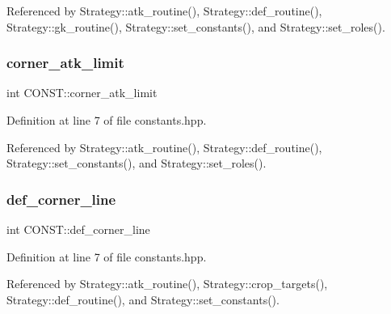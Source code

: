 Referenced by Strategy\+::atk\+\_\+routine(), Strategy\+::def\+\_\+routine(), Strategy\+::gk\+\_\+routine(), Strategy\+::set\+\_\+constants(), and Strategy\+::set\+\_\+roles().

\mbox{\label{namespace_c_o_n_s_t_a2dae2bbcbbd0735ad1544509929d1c8f}} 
\subsubsection{\texorpdfstring{corner\+\_\+atk\+\_\+limit}{corner\_atk\_limit}}
{\footnotesize\ttfamily int C\+O\+N\+S\+T\+::corner\+\_\+atk\+\_\+limit\hspace{0.3cm}{\ttfamily [static]}}



Definition at line 7 of file constants.\+hpp.



Referenced by Strategy\+::atk\+\_\+routine(), Strategy\+::def\+\_\+routine(), Strategy\+::set\+\_\+constants(), and Strategy\+::set\+\_\+roles().

\mbox{\label{namespace_c_o_n_s_t_a1ceb4c2871b41b2f17d5bff1e40e9dd0}} 
\subsubsection{\texorpdfstring{def\+\_\+corner\+\_\+line}{def\_corner\_line}}
{\footnotesize\ttfamily int C\+O\+N\+S\+T\+::def\+\_\+corner\+\_\+line\hspace{0.3cm}{\ttfamily [static]}}



Definition at line 7 of file constants.\+hpp.



Referenced by Strategy\+::atk\+\_\+routine(), Strategy\+::crop\+\_\+targets(), Strategy\+::def\+\_\+routine(), and Strategy\+::set\+\_\+constants().

\mbox{\label{namespace_c_o_n_s_t_ae8d764cbcf03a0351752bff7d9cb30e6}} 
